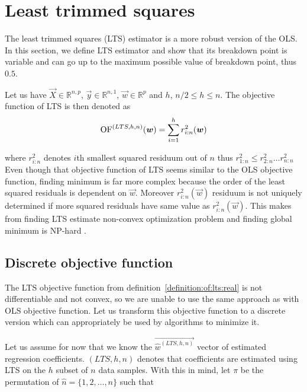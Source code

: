 \section{Least trimmed squares}
The least trimmed squares (LTS) estimator is a more robust version of the OLS. In this section, we define LTS estimator and show that its breakdown point is variable and can go up to the maximum possible value of breakdown point, thus~$0.5$.

\begin{definition} \label{definition:of:lts:real}
Let us have $\vec{X} \in \mathbb{R}^{n,p}$, $\vec{y} \in \mathbb{R}^{n,1}$, 
    $\vec{w} \in \mathbb{R}^p$ and $h$, $ n/2 \leq h \leq n$. The objective function of LTS is then denoted as 
    \begin{equation}  
        \operatorname{OF}^{(LTS,h, n)}(\boldsymbol{w}) =  \sum\limits_{i=1}^h r_{i:n}^2(\boldsymbol{w})  
    \end{equation}
\end{definition}
where $r_{i:n}^2$ denotes $i$th smallest squared residuum out of $n$ thus $r_{1:n}^2 \leq r_{2:n}^2 \ldots r_{n:n}^2$
Even though that objective function of LTS seems similar to the OLS objective function, finding minimum is far more complex because the order of the least squared residuals is dependent on $\vec{w}$. Moreover  $r_{i:n}^2(\vec{w})$ residuum is not uniquely determined if more squared residuals have same value as $r_{i:n}^2(\vec{w})$. This makes from finding LTS estimate non-convex optimization problem and finding global minimum is NP-hard \cite{bernholt2006robust}. 

\subsection{Discrete objective function}
The LTS objective function from definition~\ref{definition:of:lts:real} is not differentiable and not convex, so we are unable to use the same approach as with OLS objective function. Let us transform this objective function to a discrete version which can appropriately be used by algorithms to minimize it.

Let us assume for now that we know the $\vec{\hat{w}^{(LTS, h, n)}}$ vector of estimated regression coefficients. $(LTS, h, n)$ denotes that coefficients are estimated using LTS on the $h$ subset of $n$ data samples. 
With this in mind, let $\pi$ be the permutation of $\hat{n} = \{{1,2,\ldots, n\}}$ such that 

